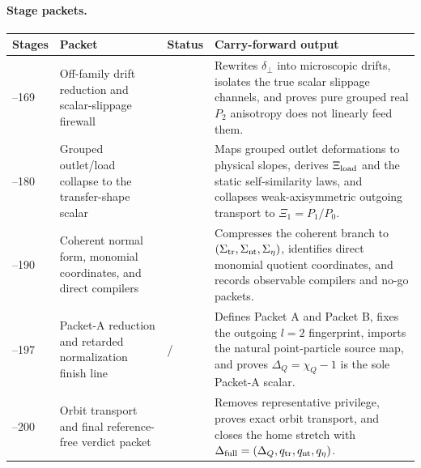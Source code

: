 \paragraph{Stage packets.}
\begin{center}
\small
\begin{tabular}{@{}>{\raggedright\arraybackslash}p{}>{\raggedright\arraybackslash}p{}>{\raggedright\arraybackslash}p{}>{\raggedright\arraybackslash}p{}@{}}
\toprule
Stages & Packet & Status & Carry-forward output \\
\midrule
164--169 & Off-family drift reduction and scalar-slippage firewall & \StatusExactClosure{} & Rewrites \(\delta_\perp\) into microscopic drifts, isolates the true scalar slippage channels, and proves pure grouped real \(P_2\) anisotropy does not linearly feed them. \\
\addlinespace
170--180 & Grouped outlet/load collapse to the transfer-shape scalar & \StatusExactClosure{} & Maps grouped outlet deformations to physical slopes, derives \(\Xi_{\rm load}\) and the static self-similarity laws, and collapses weak-axisymmetric outgoing transport to \(\Xi_1=P_1/P_0\). \\
\addlinespace
181--190 & Coherent normal form, monomial coordinates, and direct compilers & \StatusExactClosure{} & Compresses the coherent branch to \((\Sigma_{\rm tr},\Sigma_{\rm nt},\Sigma_\eta)\), identifies direct monomial quotient coordinates, and records observable compilers and no-go packets. \\
\addlinespace
191--197 & Packet-A reduction and retarded normalization finish line & \StatusExactClosure{} / \StatusReduced{} & Defines Packet A and Packet B, fixes the outgoing \(l=2\) fingerprint, imports the natural point-particle source map, and proves \(\Delta_Q=\chi_Q-1\) is the sole Packet-A scalar. \\
\addlinespace
198--200 & Orbit transport and final reference-free verdict packet & \StatusExactClosure{} & Removes representative privilege, proves exact orbit transport, and closes the home stretch with \(\Delta_{\rm full}=(\Delta_Q,q_{\rm tr},q_{\rm nt},q_\eta)\). \\
\bottomrule
\end{tabular}
\end{center}


